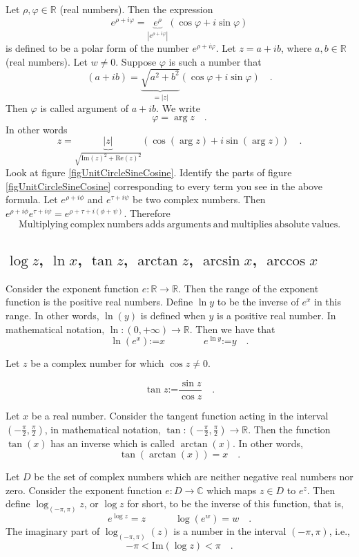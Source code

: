\documentclass[12pt]{book}
\renewcommand{\Im}{\mathrm{Im}}
\renewcommand{\Re}{\mathrm{Re}}
\newcommand{\eqdef}{\textbf{:=}}
\newcommand{\importantFormula}[1]{\begin{equation} \boxed{#1} \end{equation}}
\begin{document}
Let $\rho, \varphi\in \mathbb R$ (real numbers). Then the expression
\[
e^{\rho+i\varphi}=\underbrace{e^{\rho}}_{|e^{\rho+i\varphi}|}(\cos \varphi + i\sin \varphi)
\]
is defined to be a polar form of the number $e^{\rho+i\varphi}$. Let $z=a+ib$, where $a, b\in \mathbb R$ (real numbers). Let $w\neq 0$. Suppose $\varphi$ is such a number that
\[
(a+ib)= \underbrace{\sqrt{a^2+b^2}}_{=|z|}(\cos \varphi + i \sin \varphi)\quad. 
\]
Then $\varphi$ is called argument of $a+ib$. We write \[\varphi=\arg z\quad .\] In other words
\[z=\underbrace{|z|}_{\sqrt{\Im(z)^2+\Re(z)^2}}\left(\cos(\arg z) + i\sin (\arg z)\right)\quad .
\]
Look at figure \ref{figUnitCircleSineCosine}. Identify the parts of figure \ref{figUnitCircleSineCosine} corresponding to every term you see in the above formula.
Let $e^{\rho+i\phi}$ and $e^{\tau+i\psi}$ be two complex numbers. Then $e^{\rho+i\phi}e^{\tau+i\psi} = e^{\rho+\tau+i(\phi+\psi)}$. Therefore 
\importantFormula{
\mathrm{Multiplying~complex~numbers~adds~arguments~and~multiplies~absolute~values.}
}

\subsection{$\log z$, $\ln x$, $\tan z$, $\arctan z$, $\arcsin x$, $\arccos x$}
Consider the exponent function $e: \mathbb R \to \mathbb R$. Then the range of the exponent function is the positive real numbers. Define $\ln y$ to be the inverse of $e^x$ in this range. In other words, $\ln(y)$ is defined when $y$ is a positive real number. In mathematical notation, $\ln: (0,+\infty)\to \mathbb R$. Then we have that
\importantFormula{
\ln (e^x)\eqdef x\quad\quad \quad \quad  e^{\ln y}\eqdef y\quad .
}

Let $z$ be a complex number for which $\cos z\neq 0$. 

\importantFormula{
\tan z\eqdef \frac{\sin z}{\cos z}\quad .
}

Let $x$ be a real number. Consider the tangent function acting in the interval $(-\frac{\pi}{2}, \frac{\pi}{2})$, in mathematical notation, $\tan :(-\frac{\pi}{2}, \frac{\pi}{2})\to \mathbb R$. Then the function $\tan(x)$ has an inverse which is called $\arctan(x)$. In other words,
\[
\tan (\arctan(x))= x\quad .
\]

Let $D$ be the set of complex numbers which are neither negative real numbers nor zero. Consider the exponent function $e: D\to \mathbb C$ which maps $z\in D$ to $e^z$. Then define $\log_{(-\pi,\pi)} z$, or $\log z$ for short, to be the inverse of this function, that is,
\importantFormula{
e^{\log z} = z\quad \quad \quad \log (e^w)=w\quad .
}
The imaginary part of $\log_{(-\pi,\pi)}(z)$ is a number in the interval $(-\pi,\pi)$, i.e., 
\[
-\pi<\Im(\log z)<\pi\quad . 
\]
\end{document}
